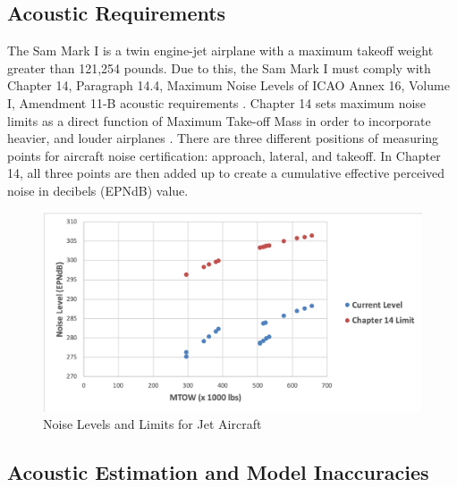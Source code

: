 \subsection{Acoustic Requirements}
The Sam Mark I is a twin engine-jet airplane with a maximum takeoff weight greater than 121,254 pounds. Due to this, the Sam Mark I must comply with Chapter 14, Paragraph 14.4, Maximum Noise Levels of ICAO Annex 16, Volume I, Amendment 11-B acoustic requirements \cite{noise_14}. Chapter 14 sets maximum noise limits as a direct function of Maximum Take-off Mass in order to incorporate heavier, and louder airplanes \cite{noise_14}. There are three different positions of measuring points for aircraft noise certification: approach, lateral, and takeoff. In Chapter 14, all three points are then added up to create a cumulative effective perceived noise in decibels (EPNdB) value.    



\begin{figure}[H]
    \centering
    \includegraphics[width=\linewidth]{Photos/Noise_limits.png}
    \caption{Noise Levels and Limits for Jet Aircraft}
    \label{fignoise}
\end{figure}

\subsection{Acoustic Estimation and Model Inaccuracies} 



